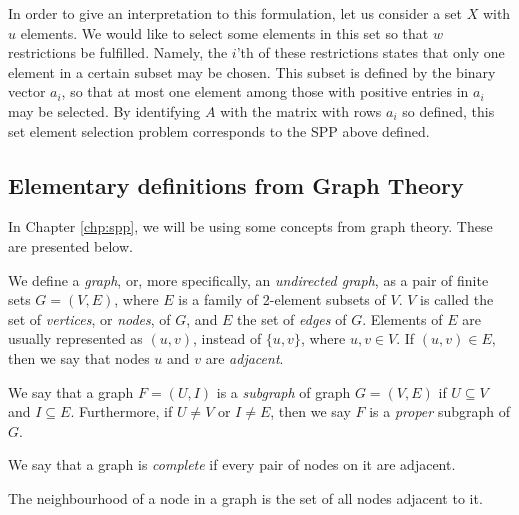 In order to give an interpretation to this formulation, let us consider a set
$X$ with $u$ elements. We would like to select some elements in this set so that
$w$ restrictions be fulfilled. Namely, the $i$'th of these restrictions states
that only one element in a certain subset may be chosen. This subset is defined
by the binary vector $a_i$, so that at most one element among those with
positive entries in $a_i$ may be selected. By identifying $A$ with the matrix
with rows $a_i$ so defined, this set element selection problem corresponds to
the SPP above defined.

\subsection{Elementary definitions from Graph Theory}

In Chapter \ref{chp:spp}, we will be using some concepts from graph theory.
These are presented below.

\begin{definition}[Graph]
    \label{def:graph}
    
    We define a \emph{graph}, or, more specifically, an \emph{undirected graph},
    as a pair of finite sets $G = (V, E)$, where $E$ is a family of 2-element
    subsets of $V$. $V$ is called the set of \emph{vertices}, or \emph{nodes},
    of $G$, and $E$ the set of \emph{edges} of $G$. Elements of $E$ are usually
    represented as $(u, v)$, instead of $\{u, v\}$, where $u, v \in V$. If $(u,
    v) \in E$, then we say that nodes $u$ and $v$ are \emph{adjacent}.
\end{definition}

\begin{definition}[Subgraph]
    \label{def:subgraph}
    
    We say that a graph $F = (U, I)$ is a \emph{subgraph} of graph $G = (V, E)$
    if $U \subseteq V$ and $I \subseteq E$. Furthermore, if $U \neq V$ or $I
    \neq E$, then we say $F$ is a \emph{proper} subgraph of $G$.
\end{definition}

\begin{definition}
    \label{def:complete-graph}
    
    We say that a graph is \emph{complete} if every pair of nodes on it are
    adjacent.
\end{definition}

\begin{definition}[Neighbourhood]
    \label{def:neighbourhood}
    
    The neighbourhood of a node in a graph is the set of all nodes adjacent to
    it.
\end{definition}

